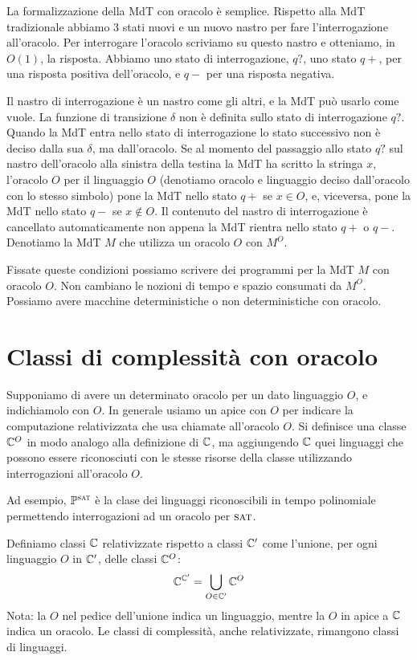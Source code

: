 La formalizzazione della MdT con oracolo è semplice. Rispetto alla MdT tradizionale abbiamo 3 stati
nuovi e un nuovo nastro per fare l'interrogazione all'oracolo. Per interrogare l'oracolo scriviamo
su questo nastro e otteniamo, in $O(1)$, la risposta. Abbiamo uno stato di interrogazione, $q?$, uno
stato $q+$, per una risposta positiva dell'oracolo, e $q-$ per una risposta negativa.

Il nastro di interrogazione è un nastro come gli altri, e la MdT può usarlo come vuole. La
funzione di transizione $\delta$ non è definita sullo stato di interrogazione $q?$. Quando la MdT
entra nello stato di interrogazione lo stato successivo non è deciso dalla sua $\delta$, ma
dall'oracolo. Se al momento del passaggio allo stato $q?$ sul nastro dell'oracolo alla sinistra
della testina la MdT ha scritto la stringa $x$, l'oracolo $O$ per il linguaggio $O$ (denotiamo
oracolo e linguaggio deciso dall'oracolo con lo stesso simbolo) pone la MdT nello stato $q+$ se $x \in
O$, e, viceversa, pone la MdT nello stato $q-$ se $x \notin O$. Il contenuto del nastro di
interrogazione è cancellato automaticamente non appena la MdT rientra nello stato $q+$ o $q-$.
Denotiamo la MdT $M$ che utilizza un oracolo $O$ con $M^{O}$.

Fissate queste condizioni possiamo scrivere dei programmi per la MdT $M$ con oracolo $O$. Non
cambiano le nozioni di tempo e spazio consumati da $M^{O}$. Possiamo avere macchine deterministiche
o non deterministiche con oracolo.

\section{Classi di complessità con oracolo}

Supponiamo di avere un determinato oracolo per un dato linguaggio $O$, e indichiamolo con $O$.  In
generale usiamo un apice con $O$ per indicare la computazione relativizzata che usa chiamate
all'oracolo $O$.  Si definisce una classe $\mathbb{C}^{O}$ in modo analogo alla definizione di
$\mathbb{C}$, ma aggiungendo $\mathbb{C}$ quei linguaggi che possono essere riconosciuti con le stesse
risorse della classe utilizzando interrogazioni all'oracolo $O$.

Ad esempio, $\mathbb{P}^{\textsc{sat}}$ è la clase dei linguaggi riconoscibili in tempo polinomiale
permettendo interrogazioni ad un oracolo per $\textsc{sat}$.

Definiamo classi $\mathbb{C}$ relativizzate rispetto a classi $\mathbb{C}'$ come l'unione, per ogni
linguaggio $O$ in $\mathbb{C}'$, delle classi $\mathbb{C}^{O}$:
\begin{equation*}
    \mathbb{C}^{\mathbb{C}'} = \bigcup_{O \in \mathbb{C}'}\mathbb{C}^{O}
\end{equation*}
Nota: la $O$ nel pedice dell'unione indica un linguaggio, mentre la $O$ in apice a $\mathbb{C}$ indica
un oracolo. Le classi di complessità, anche relativizzate, rimangono classi di linguaggi.

